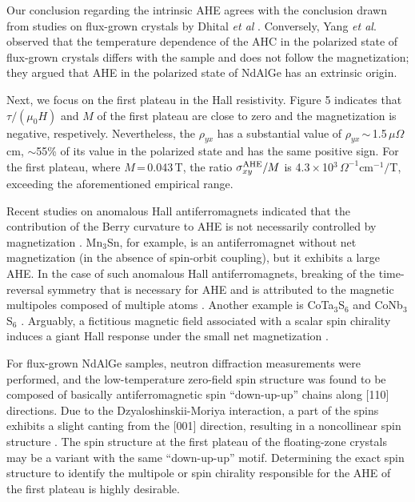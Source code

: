 \documentclass[%
preprint,
 amsmath,amssymb,
 aps,
]{revtex4-2}
\begin{document}
%
Our conclusion regarding the intrinsic AHE agrees with the conclusion drawn 
from studies on flux-grown crystals by Dhital \textit{et al} \cite{Dhital_PhyrevB_2023}. 
%
Conversely, Yang \textit{et al}. \cite{Yang_PhysRevMater_2023} observed that the temperature dependence of the AHC 
in the polarized state of flux-grown crystals differs with the sample and does not follow 
the magnetization; 
they argued that AHE in the polarized state of NdAlGe has an extrinsic origin. 
%

Next, we focus on the first plateau in the Hall resistivity. Figure 5 indicates that $\tau/(\mu_{0}H)$ 
and $M$ of the first plateau are close to zero and the magnetization is negative, respetively. 
%
Nevertheless, the $\rho_{yx}$ has a substantial value of $\rho_{yx}$\,$\sim$\,1.5\,$\mu\Omega$cm, 
$\sim$55\% of its value in the polarized state and has the same positive sign. 
%
For the first plateau, where $M$\,=\,0.043\,T, 
the ratio $\sigma_{xy}^{\rm AHE}/M$ is 4.3\,$\times$\,10$^{3}$\,$\Omega^{-1}$cm$^{-1}/$T, 
exceeding the aforementioned empirical range. 
%

%
Recent studies on anomalous Hall antiferromagnets indicated that the contribution 
of the Berry curvature to AHE is not necessarily controlled by magnetization 
\cite{Nakatsuji_AnnualReview_2022,Suzuki_PhysRevB_2017,Smejkal_NatRevMater_2022}. 
%
Mn$_{3}$Sn, for example, is an antiferromagnet without net magnetization 
(in the absence of spin-orbit coupling), but it exhibits a large AHE. 
%
In the case of such anomalous Hall antiferromagnets, 
breaking of the time-reversal symmetry that is necessary for AHE and is attributed to 
the magnetic multipoles composed of multiple atoms 
\cite{Suzuki_PhysRevB_2017,Smejkal_NatRevMater_2022}. 
%
Another example is CoTa$_{3}$S$_{6}$ and CoNb$_{3}$S$_{6}$ 
\cite{Ghimire_NatCommun_2018,Takagi_NatPhys_2023}. 
%
Arguably, a fictitious magnetic field associated with a scalar spin chirality induces a giant Hall response 
under the small net magnetization \cite{Takagi_NatPhys_2023}. 
%

%
For flux-grown NdAlGe samples, 
neutron diffraction measurements were performed, 
and the low-temperature zero-field spin structure was found to be composed 
of basically antiferromagnetic spin ``down-up-up'' chains along $\lbrack$110$\rbrack$ directions. 
%
Due to the Dzyaloshinskii-Moriya interaction, a part of the spins exhibits a slight canting 
from the $\lbrack$001$\rbrack$ direction, 
resulting in a noncollinear spin structure \cite{Yang_PhysRevMater_2023,Dhital_PhyrevB_2023}. 
%
The spin structure at the first plateau of the floating-zone crystals may be a variant 
with the same ``down-up-up'' motif. 
%
Determining the exact spin structure to identify the multipole or spin chirality responsible for 
the AHE of the first plateau is highly desirable. 
%
\end{document}
